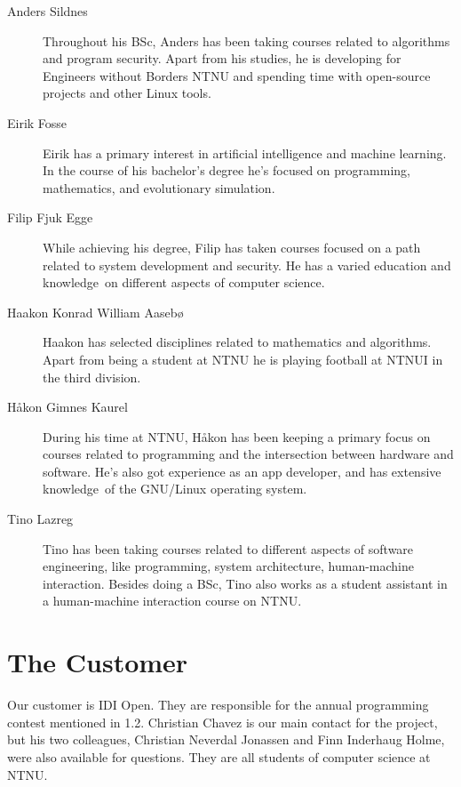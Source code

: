 \begin{description}
\item[Anders Sildnes]
Throughout his BSc, Anders has been taking courses related to algorithms
and program security. Apart from his studies, he is developing for
Engineers without Borders NTNU and spending time with open-source
projects and other Linux tools.

\item[Eirik Fosse]
Eirik has a primary interest in artificial intelligence and machine
learning. In the course of his bachelor's degree
he's focused on programming, mathematics, and
evolutionary simulation.

\item[Filip Fjuk Egge]
While achieving his degree, Filip has taken courses focused on a path
related to system development and security. He has a varied education
and knowledge\ on different aspects of computer science. 

\item[Haakon Konrad William Aaseb{\o}]
Haakon has selected disciplines related to mathematics and algorithms.
Apart from being a student at NTNU he is playing football at NTNUI in
the third division. 

\item[H{\aa}kon Gimnes Kaurel]
During his time at NTNU, H{\aa}kon has been keeping a primary focus on
courses related to programming and the intersection between hardware
and software. He's also got experience as an app
developer, and has extensive knowledge\ of the GNU/Linux operating
system. 

\item[Tino Lazreg]
Tino has been taking courses related to different aspects of software
engineering, like programming, system architecture, human-machine
interaction. Besides doing a BSc, Tino also works as a student
assistant in a human-machine interaction course on NTNU. 
\end{description}

\section{The Customer}
Our customer is IDI Open. They are responsible for the annual
programming contest mentioned in 1.2. Christian Chavez is our main contact for
the project, but his two colleagues, Christian Neverdal Jonassen and Finn
Inderhaug Holme, were
also available for questions. They are all students of computer science
at NTNU. 

